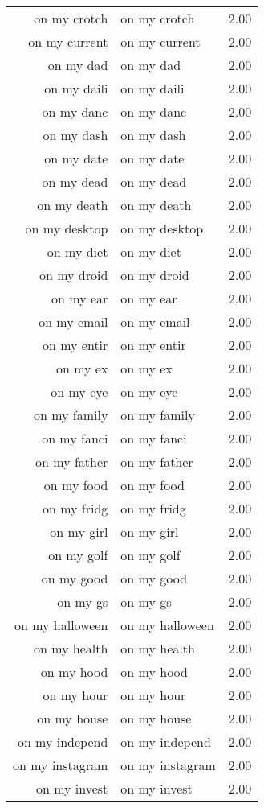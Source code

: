 \begin{table}[ht]
\begin{tabular}{rlr}
  on my crotch & on my crotch & 2.00 \\ 
  on my current & on my current & 2.00 \\ 
  on my dad & on my dad & 2.00 \\ 
  on my daili & on my daili & 2.00 \\ 
  on my danc & on my danc & 2.00 \\ 
  on my dash & on my dash & 2.00 \\ 
  on my date & on my date & 2.00 \\ 
  on my dead & on my dead & 2.00 \\ 
  on my death & on my death & 2.00 \\ 
  on my desktop & on my desktop & 2.00 \\ 
  on my diet & on my diet & 2.00 \\ 
  on my droid & on my droid & 2.00 \\ 
  on my ear & on my ear & 2.00 \\ 
  on my email & on my email & 2.00 \\ 
  on my entir & on my entir & 2.00 \\ 
  on my ex & on my ex & 2.00 \\ 
  on my eye & on my eye & 2.00 \\ 
  on my family & on my family & 2.00 \\ 
  on my fanci & on my fanci & 2.00 \\ 
  on my father & on my father & 2.00 \\ 
  on my food & on my food & 2.00 \\ 
  on my fridg & on my fridg & 2.00 \\ 
  on my girl & on my girl & 2.00 \\ 
  on my golf & on my golf & 2.00 \\ 
  on my good & on my good & 2.00 \\ 
  on my gs & on my gs & 2.00 \\ 
  on my halloween & on my halloween & 2.00 \\ 
  on my health & on my health & 2.00 \\ 
  on my hood & on my hood & 2.00 \\ 
  on my hour & on my hour & 2.00 \\ 
  on my house & on my house & 2.00 \\ 
  on my independ & on my independ & 2.00 \\ 
  on my instagram & on my instagram & 2.00 \\ 
  on my invest & on my invest & 2.00 \\ 

\end{tabular}
\end{table}
